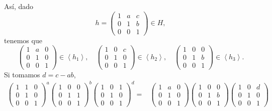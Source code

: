 \documentclass{article}
\begin{document}
\begin{sol}
\begin{description}
\begin{itemize}
\end{itemize}
Así, dado 
\[h = \begin{pmatrix} 1 & a & c \\ 0 & 1 & b \\ 0 & 0 & 1 \end{pmatrix} \in H ,\]
tenemos que 
\[\begin{pmatrix} 1 & a & 0 \\ 0 & 1 & 0 \\ 0 & 0 & 1 \end{pmatrix}\in \left\langle h_{1} \right\rangle , \quad \begin{pmatrix} 1 & 0 & c \\ 0 & 1 & 0 \\ 0 & 0 & 1 \end{pmatrix} \in \left\langle h_{2} \right\rangle, \quad \begin{pmatrix} 1 & 0 & 0 \\ 0 & 1 & b \\ 0 & 0 & 1 \end{pmatrix} \in \left\langle h_{3} \right\rangle .\]
Si tomamos $\displaystyle d = c-ab $, 
\[
\begin{split}
	\begin{pmatrix} 1 & 1 & 0 \\ 0 & 1 & 0 \\ 0 & 0 & 1 \end{pmatrix}^{a} \begin{pmatrix} 1 & 0 & 0 \\ 0 & 1 & 1 \\ 0 & 0 & 1 \end{pmatrix}^{b} \begin{pmatrix} 1 & 0 & 1 \\ 0 & 1 & 0 \\ 0 & 0 & 1 \end{pmatrix}^{d} = & \begin{pmatrix} 1 & a & 0 \\ 0 & 1 & 0 \\ 0 & 0 & 1 \end{pmatrix} \begin{pmatrix} 1 & 0 & 0 \\ 0 & 1 & b \\ 0 & 0 & 1 \end{pmatrix} \begin{pmatrix} 1 & 0 & d \\ 0 & 1 & 0 \\ 0 & 0 & 1 \end{pmatrix} \\

\end{split}\]
\end{description}
\end{sol}
\end{document}
